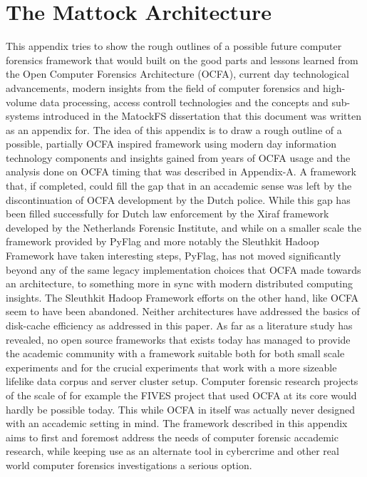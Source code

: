 \chapter{The Mattock Architecture}
This appendix tries to show the rough outlines of a possible future computer forensics framework that would built on the good parts and lessons learned from the Open Computer Forensics Architecture (OCFA), current day technological advancements, modern insights from the field of computer forensics and high-volume data processing, access controll technologies and the concepts and sub-systems introduced in the MatockFS dissertation that this document was written as an appendix for. 
The idea of this appendix is to draw a rough outline of a possible, partially OCFA inspired framework using modern day information technology components and insights gained from years of OCFA usage and the analysis done on OCFA timing that was described in Appendix-A. A framework that, if completed, could fill the gap that in an accademic sense was left by the discontinuation of OCFA development by the Dutch police. While this gap has been filled successfully for Dutch law enforcement by the Xiraf framework developed by the Netherlands Forensic Institute, and while on a smaller scale the framework provided by PyFlag and more notably the Sleuthkit Hadoop Framework have taken interesting steps, PyFlag, has not moved significantly beyond any of the same legacy implementation choices that OCFA made towards an architecture, to something more in sync with modern distributed computing insights. The Sleuthkit Hadoop Framework efforts on the other hand, like OCFA seem to have been abandoned. Neither architectures have addressed the basics of disk-cache efficiency as addressed in this paper. As far as a literature study has revealed, no open source frameworks that exists today has managed to provide the academic community with a framework suitable both for both small scale experiments and for the crucial experiments that work with a more sizeable lifelike data corpus and server cluster setup. Computer forensic research projects of the scale of for example the FIVES project that used OCFA at its core would hardly be possible today. 
This while OCFA in itself was actually never designed with an accademic setting in mind. The framework described in this appendix
aims to first and foremost address the needs of computer forensic accademic research, while keeping use as an alternate tool in cybercrime and other real world computer forensics investigations a serious option. 
